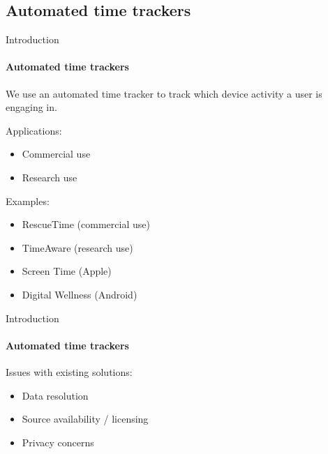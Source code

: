 \documentclass[xcolor={dvipsnames,table},12pt]{beamer}
\begin{document}
\subsection{Automated time trackers}
\begin{frame}{Introduction}
    \framesubtitle{Automated time trackers}

    We use an automated time tracker to track which device activity a user is engaging in.

    Applications:
    \begin{itemize}
        \item Commercial use
        \item Research use
    \end{itemize}

    Examples:
    \begin{itemize}
        \item RescueTime (commercial use)
        \item TimeAware (research use)
        \item Screen Time (Apple)
        \item Digital Wellness (Android)
    \end{itemize}
\end{frame}


\begin{frame}{Introduction}
    \framesubtitle{Automated time trackers}

    Issues with existing solutions:
    \begin{itemize}
        \item Data resolution
        \item Source availability / licensing
        \item Privacy concerns
    \end{itemize}
\end{frame}
\end{document}
